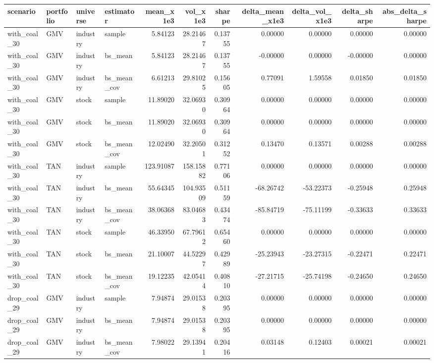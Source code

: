 \begin{tabular}{llllrrrrrrr}
\toprule
scenario & portfolio & universe & estimator & mean\_x1e3 & vol\_x1e3 & sharpe & delta\_mean\_x1e3 & delta\_vol\_x1e3 & delta\_sharpe & abs\_delta\_sharpe \\
\midrule
with\_coal\_30 & GMV & industry & sample & 5.84123 & 28.21467 & 0.13755 & 0.00000 & 0.00000 & 0.00000 & 0.00000 \\
with\_coal\_30 & GMV & industry & bs\_mean & 5.84123 & 28.21467 & 0.13755 & -0.00000 & 0.00000 & -0.00000 & 0.00000 \\
with\_coal\_30 & GMV & industry & bs\_mean\_cov & 6.61213 & 29.81025 & 0.15605 & 0.77091 & 1.59558 & 0.01850 & 0.01850 \\
with\_coal\_30 & GMV & stock & sample & 11.89020 & 32.06930 & 0.30964 & 0.00000 & 0.00000 & 0.00000 & 0.00000 \\
with\_coal\_30 & GMV & stock & bs\_mean & 11.89020 & 32.06930 & 0.30964 & 0.00000 & 0.00000 & 0.00000 & 0.00000 \\
with\_coal\_30 & GMV & stock & bs\_mean\_cov & 12.02490 & 32.20501 & 0.31252 & 0.13470 & 0.13571 & 0.00288 & 0.00288 \\
with\_coal\_30 & TAN & industry & sample & 123.91087 & 158.15882 & 0.77106 & 0.00000 & 0.00000 & 0.00000 & 0.00000 \\
with\_coal\_30 & TAN & industry & bs\_mean & 55.64345 & 104.93509 & 0.51159 & -68.26742 & -53.22373 & -0.25948 & 0.25948 \\
with\_coal\_30 & TAN & industry & bs\_mean\_cov & 38.06368 & 83.04683 & 0.43474 & -85.84719 & -75.11199 & -0.33633 & 0.33633 \\
with\_coal\_30 & TAN & stock & sample & 46.33950 & 67.79612 & 0.65460 & 0.00000 & 0.00000 & 0.00000 & 0.00000 \\
with\_coal\_30 & TAN & stock & bs\_mean & 21.10007 & 44.52297 & 0.42989 & -25.23943 & -23.27315 & -0.22471 & 0.22471 \\
with\_coal\_30 & TAN & stock & bs\_mean\_cov & 19.12235 & 42.05414 & 0.40810 & -27.21715 & -25.74198 & -0.24650 & 0.24650 \\
drop\_coal\_29 & GMV & industry & sample & 7.94874 & 29.01538 & 0.20395 & 0.00000 & 0.00000 & 0.00000 & 0.00000 \\
drop\_coal\_29 & GMV & industry & bs\_mean & 7.94874 & 29.01538 & 0.20395 & 0.00000 & 0.00000 & 0.00000 & 0.00000 \\
drop\_coal\_29 & GMV & industry & bs\_mean\_cov & 7.98022 & 29.13941 & 0.20416 & 0.03148 & 0.12403 & 0.00021 & 0.00021 \\

\end{tabular}

